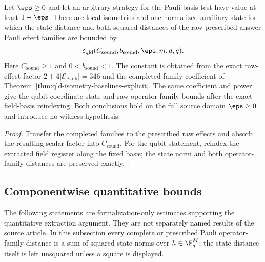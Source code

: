 \begin{theorem}
\label{thm:pauli-soundness-explicit-baseline}
\leanok
{}
Let $\eps\geq0$ and let an arbitrary strategy for the Pauli basis test have
value at least $1-\eps$.  There are local isometries and one normalized
auxiliary state for which the state distance and both squared distances of the
raw prescribed-answer Pauli effect families are bounded by
\[
 \delta_{\mathrm{qld}}(C_{\mathrm{sound}},b_{\mathrm{sound}},
   \eps,m,d,q).
\]
Here $C_{\mathrm{sound}}\geq1$ and $0<b_{\mathrm{sound}}<1$.
The constant is obtained from the exact raw-effect factor
$2+4\lvert\mathcal E_{\mathrm{Pauli}}\rvert=346$ and the completed-family
coefficient of Theorem~\ref{thm:qld-isometry-baselines-explicit}.  The same
coefficient and power give the qubit-coordinate state and raw operator-family
bounds after the exact field-basis reindexing.  Both conclusions hold on the
full source domain $\eps\geq0$ and introduce no witness hypothesis.
\end{theorem}
\begin{proof}
\leanok
Transfer the completed families to the prescribed raw effects and absorb the
resulting scalar factor into $C_{\mathrm{sound}}$.  For the qubit statement,
reindex the extracted field register along the fixed basis; the state norm and
both operator-family distances are preserved exactly.
\end{proof}

\subsection{Componentwise quantitative bounds}

The following statements are formalization-only estimates supporting the
quantitative extraction argument.  They are not separately named results of
the source article.  In this subsection every complete or prescribed Pauli
operator-family distance is a sum of squared state norms over
$h\in\F_q^M$; the state distance itself is left unsquared unless a square is
displayed.

